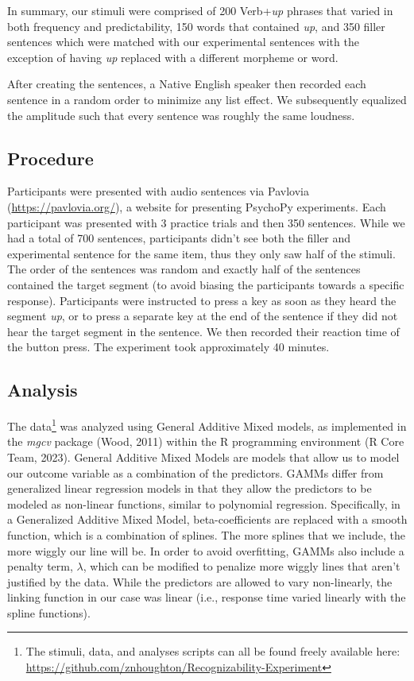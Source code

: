 \documentclass[
  man,floatsintext]{apa6}
\begin{document}
In summary, our stimuli were comprised of 200 Verb+\emph{up} phrases that varied in both frequency and predictability, 150 words that contained \emph{up}, and 350 filler sentences which were matched with our experimental sentences with the exception of having \emph{up} replaced with a different morpheme or word.

After creating the sentences, a Native English speaker then recorded each sentence in a random order to minimize any list effect. We subsequently equalized the amplitude such that every sentence was roughly the same loudness.

\subsection{Procedure}\label{procedure}

Participants were presented with audio sentences via Pavlovia (\url{https://pavlovia.org/}), a website for presenting PsychoPy experiments. Each participant was presented with 3 practice trials and then 350 sentences. While we had a total of 700 sentences, participants didn't see both the filler and experimental sentence for the same item, thus they only saw half of the stimuli. The order of the sentences was random and exactly half of the sentences contained the target segment (to avoid biasing the participants towards a specific response). Participants were instructed to press a key as soon as they heard the segment \emph{up}, or to press a separate key at the end of the sentence if they did not hear the target segment in the sentence. We then recorded their reaction time of the button press. The experiment took approximately 40 minutes.

\subsection{Analysis}\label{analysis}

The data\footnote{The stimuli, data, and analyses scripts can all be found freely available here: \url{https://github.com/znhoughton/Recognizability-Experiment}} was analyzed using General Additive Mixed models, as implemented in the \emph{mgcv} package (Wood, 2011) within the R programming environment (R Core Team, 2023). General Additive Mixed Models are models that allow us to model our outcome variable as a combination of the predictors. GAMMs differ from generalized linear regression models in that they allow the predictors to be modeled as non-linear functions, similar to polynomial regression. Specifically, in a Generalized Additive Mixed Model, beta-coefficients are replaced with a smooth function, which is a combination of splines. The more splines that we include, the more wiggly our line will be. In order to avoid overfitting, GAMMs also include a penalty term, \(\lambda\), which can be modified to penalize more wiggly lines that aren't justified by the data. While the predictors are allowed to vary non-linearly, the linking function in our case was linear (i.e., response time varied linearly with the spline functions).
\end{document}
